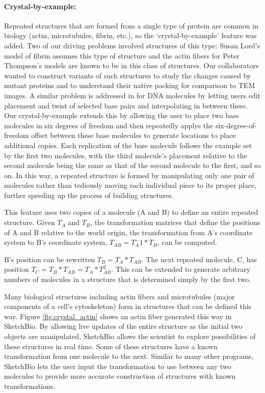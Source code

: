 \documentclass[twocolumn]{bmcart}%
\begin{document}
\paragraph*{Crystal-by-example:}
Repeated structures that are formed from a single type of protein are common in biology (actin, microtubules, fibrin, etc.), so the ‘crystal-by-example' feature was added.
Two of our driving problems involved structures of this type: Susan Lord's model of fibrin assumes this type of structure and the actin fibers for Peter Thompson's models are known to be in this class of structures.
Our collaborators wanted to construct variants of such structures to study the changes caused by mutant proteins and to understand their native packing for comparison to TEM images.
A similar problem is addressed in \cite{hornus2013easy} for DNA molecules by letting users edit placement and twist of selected base pairs and interpolating in between these.
Our crystal-by-example extends this by allowing the user to place two base molecules in six degrees of freedom and then repeatedly applys the six-degree-of-freedom offset between these base molecules to generate locations to place additional copies.
Each replication of the base molecule follows the example set by the first two molecules, with the third molecule's placement relative to the second molecule being the same as that of the second molecule to the first, and so on.
In this way, a repeated structure is formed by manipulating only one pair of molecules rather than tediously moving each individual piece to its proper place, further speeding up the process of building structures.

This feature uses two copies of a molecule (A and B) to define an entire repeated structure.
Given $T_A$ and $T_B$, the transformation matrices that define the positions of A and B relative to the world origin, the transformation from A's coordinate system to B's coordinate system, $T_{AB} = T_A^-1*T_B$, can be computed.

B's position can be rewritten $T_B = T_A*T_{AB}$.  The next repeated molecule, C, has position $T_C = T_B*T_{AB} = T_A*T_{AB}^2$.
This can be extended to generate arbitrary numbers of molecules in a structure that is determined simply by the first two.

Many biological structures including actin fibers and microtubules (major components of a cell's cytoskeleton) form in structures that can be defined this way.
Figure \ref{fig:crystal_actin} shows an actin fiber generated this way in SketchBio.
By allowing live updates of the entire structure as the initial two objects are manipulated, SketchBio allows the scientist to explore possibilities of these structures in real time.
Some of these structures have a known transformation from one molecule to the next.
Similar to many other programs, SketchBio lets the user input the transformation to use between any two molecules to provide more accurate construction of structures with known transformations.
\end{document}
